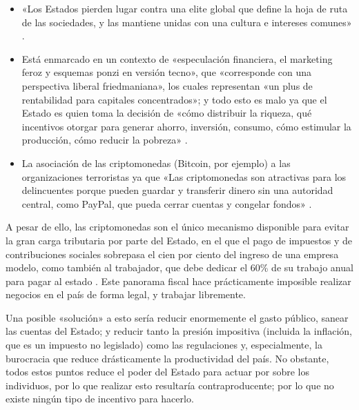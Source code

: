 \documentclass[12pt,a4paper,twoside]{book}
\begin{document}
\begin{itemize}
\item «Los Estados pierden lugar contra una elite global que define la hoja de ruta de las sociedades, y las mantiene unidas con una cultura e intereses comunes» \cite{cripto:estado-pag12}.
\item Está enmarcado en un contexto de «especulación financiera, el marketing feroz y esquemas ponzi en versión tecno», que «corresponde con una perspectiva liberal friedmaniana», los cuales representan «un plus de rentabilidad para capitales concentrados»; y todo esto es malo ya que el Estado es quien toma la decisión de «cómo distribuir la riqueza, qué incentivos otorgar para generar ahorro, inversión, consumo, cómo estimular la producción, cómo reducir la pobreza» \cite{cripto:estado2-pag12}.
\item La asociación de las criptomonedas (Bitcoin, por ejemplo) a las organizaciones terroristas ya que «Las criptomonedas son atractivas para los delincuentes porque pueden guardar y transferir dinero sin una autoridad central, como PayPal, que pueda cerrar cuentas y congelar fondos» \cite{cripto:estado3-infobae}.
\end{itemize}

A pesar de ello, las criptomonedas son el único mecanismo disponible para evitar la gran carga tributaria por parte del Estado, en el que el pago de impuestos y de contribuciones sociales sobrepasa el cien por ciento del ingreso de una empresa modelo, como también al trabajador, que debe dedicar el 60\% de su trabajo anual para pagar al estado \cite{mises:revuelta}. Este panorama fiscal hace prácticamente imposible realizar negocios en el país de forma legal, y trabajar libremente.

Una posible «solución» a esto sería reducir enormemente el gasto público, sanear las cuentas del Estado; y reducir tanto la presión impositiva (incluida la inflación, que es un impuesto no legislado) como las regulaciones y, especialmente, la burocracia que reduce drásticamente la productividad del país. No obstante, todos estos puntos reduce el poder del Estado para actuar por sobre los individuos, por lo que realizar esto resultaría contraproducente; por lo que no existe ningún tipo de incentivo para hacerlo.
\end{document}
